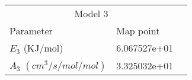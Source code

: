   
  
   \begin{tabular}{llr}  
    \toprule
    \multicolumn{2}{c}{Model 3} \\
    \cmidrule(r){1-2}
    Parameter   & Map point \\
    \midrule
    $E_3$ (KJ/mol)     &  6.067527e+01  \\
    $A_3$ $(cm^3/s/mol/mol)$     &  3.325032e+01  \\
    \bottomrule
  \end{tabular}










